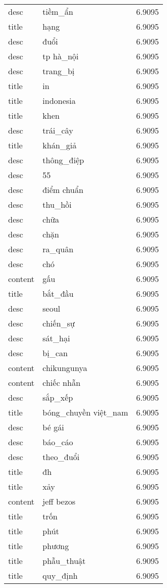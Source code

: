 \documentclass{article}
\begin{document}
\begin{tabular}{lll}
desc & tiềm\_ẩn & 6.9095\\
title & hạng & 6.9095\\
desc & đuổi & 6.9095\\
desc & tp hà\_nội & 6.9095\\
desc & trang\_bị & 6.9095\\
title & in & 6.9095\\
title & indonesia & 6.9095\\
title & khen & 6.9095\\
desc & trái\_cây & 6.9095\\
title & khán\_giả & 6.9095\\
desc & thông\_điệp & 6.9095\\
desc & 55 & 6.9095\\
desc & điểm chuẩn & 6.9095\\
desc & thu\_hồi & 6.9095\\
desc & chữa & 6.9095\\
desc & chặn & 6.9095\\
desc & ra\_quân & 6.9095\\
desc & chó & 6.9095\\
content & gấu & 6.9095\\
title & bắt\_đầu & 6.9095\\
desc & seoul & 6.9095\\
desc & chiến\_sự & 6.9095\\
desc & sát\_hại & 6.9095\\
desc & bị\_can & 6.9095\\
content & chikungunya & 6.9095\\
content & chiếc nhẫn & 6.9095\\
desc & sắp\_xếp & 6.9095\\
title & bóng\_chuyền việt\_nam & 6.9095\\
desc & bé gái & 6.9095\\
desc & báo\_cáo & 6.9095\\
desc & theo\_đuổi & 6.9095\\
title & đh & 6.9095\\
title & xảy & 6.9095\\
content & jeff bezos & 6.9095\\
title & trốn & 6.9095\\
title & phút & 6.9095\\
title & phương & 6.9095\\
title & phẫu\_thuật & 6.9095\\
title & quy\_định & 6.9095\\

\end{tabular}
\end{document}
